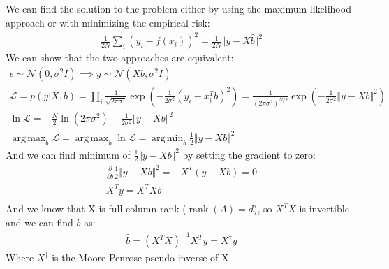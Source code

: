 \documentclass[]{article}
\numberwithin{equation}{section}
\DeclareMathOperator*{\rank}{rank}
\newcommand{\norm}[2][]{\Vert #2\Vert_{#1}}
\newcommand{\transpose}{^T}
\DeclareMathOperator*{\argmax}{arg\,max}
\DeclareMathOperator*{\argmin}{arg\,min}
\begin{document}
\subsection{}
We can find the solution to the problem either by using the maximum likelihood approach or with minimizing the empirical risk:
\begin{align}
    \label{eq:2:ML}
    \frac{1}{2N} \sum_i (y_i - f(x_i))^2 = \frac{1}{2N}\norm{y - X\hat{b}}^2
\end{align}
We can show that the two approaches are equivalent:
\begin{gather}
\label{eq:2:MLE}
\epsilon \sim \mathcal{N}(0, \sigma^2 I) \implies y \sim \mathcal{N}(Xb, \sigma^2 I) \\
\mathcal{L} = p(y\vert X, b) = \prod_i \frac{1}{\sqrt{2\pi\sigma^2}} \exp\left(-\frac{1}{2\sigma^2} (y_i - x_i\transpose b)^2\right) = \frac{1}{(2\pi\sigma^2)^{N/2}} \exp\left(-\frac{1}{2\sigma^2} \norm{y - Xb}^2\right)\\
\ln \mathcal{L} = -\frac{N}{2} \ln(2\pi\sigma^2) - \frac{1}{2\sigma^2} \norm{y - Xb}^2 \\
\argmax_b \mathcal{L} = \argmax_b \ln \mathcal{L} = \argmin_b \frac{1}{2} \norm{y - Xb}^2
\end{gather}
And we can find minimum of \( \frac{1}{2} \norm{y - Xb}^2 \) by setting the gradient to zero:
\begin{gather}
    \label{eq:2:MSE}
\frac{\partial}{\partial b} \frac{1}{2} \norm{y - Xb}^2 = -X\transpose (y - Xb) = 0 \\
X\transpose y = X\transpose Xb \\
\end{gather}
And we know that X is full column rank (\(\rank(A)=d\)), so \(X\transpose X\) is invertible and we can find \(b\) as:
\begin{gather}
    \hat{b} = (X\transpose X)^{-1} X\transpose y = X^{\dagger} y
\end{gather}
Where \(X^{\dagger}\) is the Moore-Penrose pseudo-inverse of X. 
\end{document}
